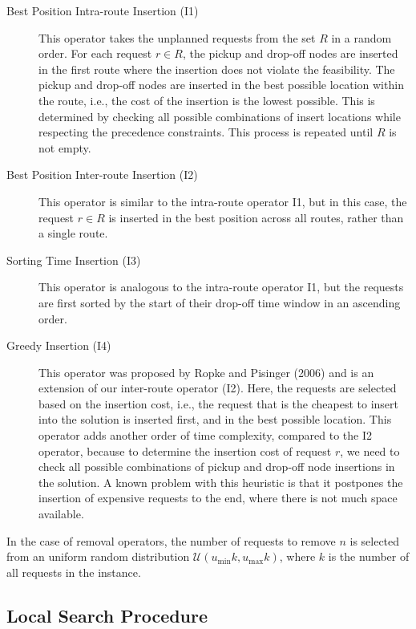 \begin{description}
    		\item [Best Position Intra-route Insertion (I1)] This operator takes the unplanned requests from the set $R$ in a random order. For each request $r \in R$, the pickup and drop-off nodes are inserted in the first route where the insertion does not violate the feasibility. The pickup and drop-off nodes are inserted in the best possible location within the route, i.e., the cost of the insertion is the lowest possible. This is determined by checking all possible combinations of insert locations while respecting the precedence constraints. This process is repeated until $R$ is not empty.
    		
    		\item [Best Position Inter-route Insertion (I2)] This operator is similar to the intra-route operator I1, but in this case, the request $r \in R$ is inserted in the best position across all routes, rather than a single route.
    		
    		\item [Sorting Time Insertion (I3)] This operator is analogous to the intra-route operator I1, but the requests are first sorted by the start of their drop-off time window in an ascending order.
    		
    		\item [Greedy Insertion (I4)] This operator was proposed by Ropke and Pisinger (2006) \cite{Ropke2006} and is an extension of our inter-route operator (I2). Here, the requests are selected based on the insertion cost, i.e., the request that is the cheapest to insert into the solution is inserted first, and in the best possible location. This operator adds another order of time complexity, compared to the I2 operator, because to determine the insertion cost of request $r$, we need to check all possible combinations of pickup and drop-off node insertions in the solution. A known problem with this heuristic is that it postpones the insertion of expensive requests to the end, where there is not much space available.
    		
    	\end{description}
    
    In the case of removal operators, the number of requests to remove $n$ is selected from an uniform random distribution $\mathcal{U}(u_{\mathrm{min}}k, u_{\mathrm{max}}k)$, where $k$ is the number of all requests in the instance.
    
    \subsection{Local Search Procedure} \label{halns:local-search}
    
